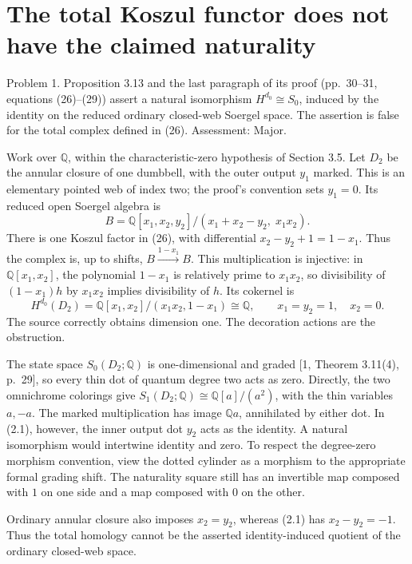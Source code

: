 \documentclass[10pt]{article}
\begin{document}
\section*{The total Koszul functor does not have the claimed naturality}
Problem 1.  Proposition 3.13 and the last paragraph of its proof (pp. 30–31, equations (26)–(29)) assert a natural isomorphism \(H^{d_0}\cong S_0\), induced by the identity on the reduced ordinary closed-web Soergel space. The assertion is false for the total complex defined in (26). Assessment: Major.\par
Work over \(\mathbb Q\), within the characteristic-zero hypothesis of Section 3.5. Let \(D_2\) be the annular closure of one dumbbell, with the outer output \(y_1\) marked. This is an elementary pointed web of index two; the proof’s convention sets \(y_1=0\). Its reduced open Soergel algebra is \[B=\mathbb Q[x_1,x_2,y_2]/(x_1+x_2-y_2,\;x_1x_2).\] There is one Koszul factor in (26), with differential \(x_2-y_2+1=1-x_1\). Thus the complex is, up to shifts, \(B\xrightarrow{1-x_1}B\). This multiplication is injective: in \(\mathbb Q[x_1,x_2]\), the polynomial \(1-x_1\) is relatively prime to \(x_1x_2\), so divisibility of \((1-x_1)h\) by \(x_1x_2\) implies divisibility of \(h\). Its cokernel is \[H^{d_0}(D_2)=
 \mathbb Q[x_1,x_2]/(x_1x_2,1-x_1)\cong\mathbb Q,
 \qquad x_1=y_2=1,\quad x_2=0.                   \tag{2.1}\] The source correctly obtains dimension one. The decoration actions are the obstruction.\par
The state space \(S_0(D_2;\mathbb Q)\) is one-dimensional and graded [1, Theorem 3.11(4), p. 29], so every thin dot of quantum degree two acts as zero. Directly, the two omnichrome colorings give \(S_1(D_2;\mathbb Q)\cong\mathbb Q[a]/(a^2)\), with the thin variables \(a,-a\). The marked multiplication has image \(\mathbb Qa\), annihilated by either dot. In (2.1), however, the inner output dot \(y_2\) acts as the identity. A natural isomorphism would intertwine identity and zero. To respect the degree-zero morphism convention, view the dotted cylinder as a morphism to the appropriate formal grading shift. The naturality square still has an invertible map composed with \(1\) on one side and a map composed with \(0\) on the other.\par
Ordinary annular closure also imposes \(x_2=y_2\), whereas (2.1) has \(x_2-y_2=-1\). Thus the total homology cannot be the asserted identity-induced quotient of the ordinary closed-web space.\par
\end{document}
